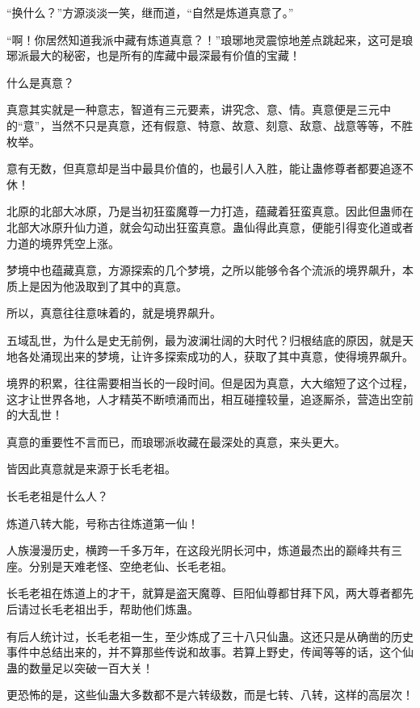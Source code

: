 
\begin{this_body}

“换什么？”方源淡淡一笑，继而道，“自然是炼道真意了。”

“啊！你居然知道我派中藏有炼道真意？！”琅琊地灵震惊地差点跳起来，这可是琅琊派最大的秘密，也是所有的库藏中最深最有价值的宝藏！

什么是真意？

真意其实就是一种意志，智道有三元要素，讲究念、意、情。真意便是三元中的“意”，当然不只是真意，还有假意、特意、故意、刻意、敌意、战意等等，不胜枚举。

意有无数，但真意却是当中最具价值的，也最引人入胜，能让蛊修尊者都要追逐不休！

北原的北部大冰原，乃是当初狂蛮魔尊一力打造，蕴藏着狂蛮真意。因此但蛊师在北部大冰原升仙力道，就会勾动出狂蛮真意。蛊仙得此真意，便能引得变化道或者力道的境界凭空上涨。

梦境中也蕴藏真意，方源探索的几个梦境，之所以能够令各个流派的境界飙升，本质上是因为他汲取到了其中的真意。

所以，真意往往意味着的，就是境界飙升。

五域乱世，为什么是史无前例，最为波澜壮阔的大时代？归根结底的原因，就是天地各处涌现出来的梦境，让许多探索成功的人，获取了其中真意，使得境界飙升。

境界的积累，往往需要相当长的一段时间。但是因为真意，大大缩短了这个过程，这才让世界各地，人才精英不断喷涌而出，相互碰撞较量，追逐厮杀，营造出空前的大乱世！

真意的重要性不言而已，而琅琊派收藏在最深处的真意，来头更大。

皆因此真意就是来源于长毛老祖。

长毛老祖是什么人？

炼道八转大能，号称古往炼道第一仙！

人族漫漫历史，横跨一千多万年，在这段光阴长河中，炼道最杰出的巅峰共有三座。分别是天难老怪、空绝老仙、长毛老祖。

长毛老祖在炼道上的才干，就算是盗天魔尊、巨阳仙尊都甘拜下风，两大尊者都先后请过长毛老祖出手，帮助他们炼蛊。

有后人统计过，长毛老祖一生，至少炼成了三十八只仙蛊。这还只是从确凿的历史事件中总结出来的，并不算那些传说和故事。若算上野史，传闻等等的话，这个仙蛊的数量足以突破一百大关！

更恐怖的是，这些仙蛊大多数都不是六转级数，而是七转、八转，这样的高层次！


\end{this_body}
